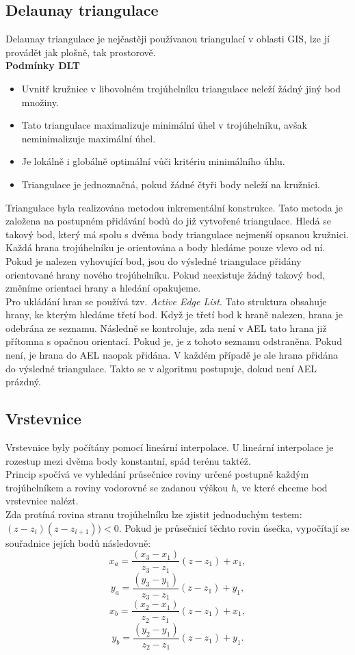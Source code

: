 \documentclass{article}
\begin{document}
\subsection{Delaunay triangulace}
\indent Delaunay triangulace je nejčastěji používanou triangulací v oblasti GIS, lze jí provádět jak plošně, tak prostorově. \\
\textbf{Podmínky DLT}
\begin{itemize}
	\item Uvnitř kružnice v libovolném trojúhelníku triangulace neleží žádný jiný bod množiny.
	\item Tato triangulace maximalizuje minimální úhel v trojúhelníku, avšak neminimalizuje maximální úhel.
	\item Je lokálně i globálně optimální vůči kritériu minimálního úhlu. 
	\item Triangulace je jednoznačná, pokud žádné čtyři body neleží na kružnici.
\end{itemize}
\indent Triangulace byla realizována metodou inkrementální konstrukce. Tato metoda je založena na postupném přidávání bodů do již vytvořené triangulace. Hledá se takový bod, který má spolu s dvěma body triangulace nejmenší opsanou kružnici. Každá hrana trojúhelníku je orientována a body hledáme pouze vlevo od ní. \\
\indent Pokud je nalezen vyhovující bod, jsou do výsledné triangulace přidány orientované hrany nového trojúhelníku. Pokud neexistuje žádný takový bod, změníme orientaci hrany a hledání opakujeme. \\
\indent Pro ukládání hran se používá tzv. \textit{Active Edge List}. Tato struktura obsahuje hrany, ke kterým hledáme třetí bod. Když je třetí bod k hraně nalezen, hrana je odebrána ze seznamu. Následně se kontroluje, zda není v AEL tato hrana již přítomna s opačnou orientací. Pokud je, je z tohoto seznamu odstraněna. Pokud není, je hrana do AEL naopak přidána. V každém případě je ale hrana přidána do výsledné triangulace. Takto se v algoritmu postupuje, dokud není AEL prázdný. 
\subsection{Vrstevnice}
\indent Vrstevnice byly počítány pomocí lineární interpolace. U lineární interpolace je rozestup mezi dvěma body konstantní, spád terénu taktéž. \\
\indent Princip spočívá ve vyhledání průsečnice roviny určené postupně každým trojúhelníkem a roviny vodorovné se zadanou výškou \textit{h}, ve které chceme bod vrstevnice nalézt. \\
\indent Zda protíná rovina stranu trojúhelníku lze zjistit jednoduchým testem:
$(z-z_i)(z-z_{i+1}))<0$.
\indent Pokud je průsečnicí těchto rovin úsečka, vypočítají se souřadnice jejích bodů následovně:
$$ x_a = \frac{(x_3-x_1)}{z_3-z_1}(z-z_1)+x_1, $$
$$y_a = \frac{(y_3-y_1)}{z_3-z_1}(z-z_1)+y_1,$$
$$ x_b = \frac{(x_2-x_1)}{z_2-z_1}(z-z_1)+x_1, $$
$$y_b = \frac{(y_2-y_1)}{z_2-z_1}(z-z_1)+y_1.$$
\end{document}
